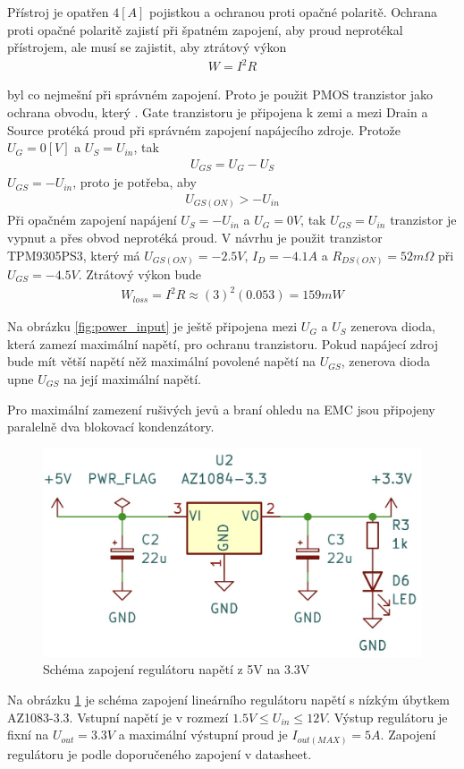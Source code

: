 Přístroj je opatřen $4 [A]$ pojistkou a ochranou proti opačné polaritě.
Ochrana proti opačné polaritě zajistí při špatném zapojení, aby proud neprotékal přístrojem, ale musí se zajistit, aby ztrátový výkon
\begin{align*}
    W = I^2 R
\end{align*}

byl co nejmešní při správném zapojení. Proto je použit PMOS tranzistor jako ochrana obvodu, který . Gate tranzistoru je připojena k zemi a mezi Drain a Source protéká proud při správném zapojení napájecího zdroje. Protože $ U_G = 0 [V]$ a $U_S = U_{in}$, tak
\begin{align*}
    U_{GS} = U_G - U_S
\end{align*}
$U_{GS} = -U_{in} $, proto je potřeba, aby
\begin{align*}
    U_{GS(ON)} > -U_{in}
\end{align*}
Při opačném zapojení napájení $U_S = -U_{in}$ a $ U_G = 0 V$, tak  $U_{GS} = U_{in}$ tranzistor je vypnut a přes obvod neprotéká proud.
V návrhu je použit tranzistor TPM9305PS3, který má  $U_{GS(ON)} = -2.5V $,  $I_D = -4.1A$ a $R_{DS(ON)} = 52m \Omega$ při $U_{GS} = -4.5V$.
Ztrátový výkon bude
\begin{align*}
    W_{loss} = I^2 R \approx (3)^2 (0.053) =  159 mW
\end{align*}

Na obrázku \ref{fig:power_input} je ještě připojena mezi $U_G$ a $U_S$ zenerova dioda, která zamezí maximální napětí, pro ochranu tranzistoru. Pokud napájecí zdroj bude mít větší napětí něž maximální povolené napětí na $U_{GS}$, zenerova dioda upne $U_{GS}$ na její maximální napětí.
\par
Pro maximální zamezení rušivých jevů a braní ohledu na EMC jsou připojeny paralelně dva blokovací kondenzátory.

\begin{figure}[H]
    \includegraphics[width=0.9\linewidth]{pictures/ldo_3v3.jpg}
    \caption{Schéma zapojení regulátoru napětí z 5V na 3.3V}
    \label{fig:stepdown}
\end{figure}
Na obrázku \ref{fig:stepdown} je schéma zapojení lineárního regulátoru napětí s nízkým úbytkem AZ1083-3.3. Vstupní napětí je v rozmezí $1.5V \leq U_{in} \leq 12V $. Výstup regulátoru je fixní na $U_{out} = 3.3V$ a maximální výstupní proud je $I_{out(MAX)} = 5A$. Zapojení regulátoru je podle doporučeného zapojení v datasheet.


